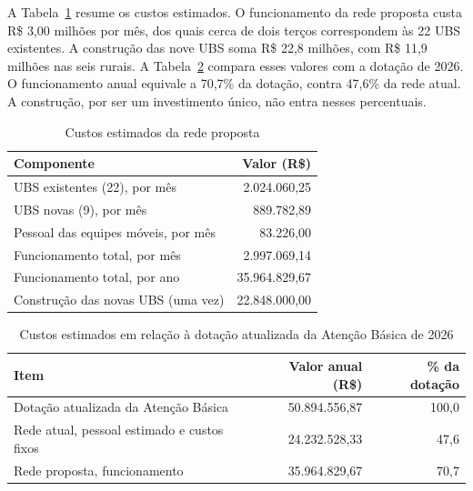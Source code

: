A Tabela~\ref{tab:custos} resume os custos estimados. O funcionamento da rede proposta custa
R\$ 3,00 milhões por mês, dos quais cerca de dois terços correspondem às 22 UBS existentes. A construção
das nove UBS soma R\$ 22,8 milhões, com R\$ 11,9 milhões nas seis rurais. A Tabela~\ref{tab:orcamento}
compara esses valores com a dotação de 2026. O funcionamento anual equivale a 70,7\% da dotação, contra
47,6\% da rede atual. A construção, por ser um investimento único, não entra nesses percentuais.

\begin{table}[htbp]\centering
\caption{Custos estimados da rede proposta}\label{tab:custos}
\begin{tabular}{lr}\toprule Componente & Valor (R\$)\\\midrule
UBS existentes (22), por mês & 2.024.060,25\\
UBS novas (9), por mês & 889.782,89\\
Pessoal das equipes móveis, por mês & 83.226,00\\
Funcionamento total, por mês & 2.997.069,14\\
Funcionamento total, por ano & 35.964.829,67\\
Construção das novas UBS (uma vez) & 22.848.000,00\\
\bottomrule\end{tabular}
\end{table}

\begin{table}[htbp]\centering
\caption{Custos estimados em relação à dotação atualizada da Atenção Básica de 2026}\label{tab:orcamento}
\begin{tabular}{lrr}\toprule Item & Valor anual (R\$) & \% da dotação\\\midrule
Dotação atualizada da Atenção Básica & 50.894.556,87 & 100,0\\
Rede atual, pessoal estimado e custos fixos & 24.232.528,33 & 47,6\\
Rede proposta, funcionamento & 35.964.829,67 & 70,7\\
\bottomrule\end{tabular}
\end{table}


